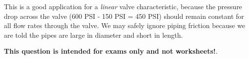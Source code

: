 \vskip 10pt

This is a good application for a {\it linear} valve characteristic, because the pressure drop across the valve (600 PSI - 150 PSI = 450 PSI) should remain constant for all flow rates through the valve.  We may safely ignore piping friction because we are told the pipes are large in diameter and short in length.







{\bf This question is intended for exams only and not worksheets!}.



